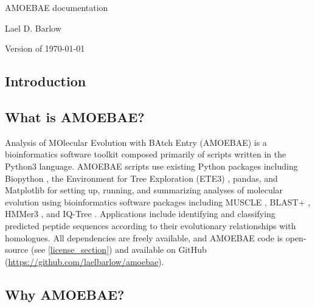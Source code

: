 \documentclass[12pt,letterpaper]{article}
\begin{document}
\begin{titlepage}
	\centering
    {\huge AMOEBAE documentation\par}
	\vspace{2cm}
    {\Large Lael D. Barlow\par}
	\vfill
	{\large Version of \today\par}
\end{titlepage}

\newpage
\tableofcontents

\newpage
{}
\begin{linenumbers}

\section{Introduction}


\subsection{What is AMOEBAE?}

Analysis of MOlecular Evolution with BAtch Entry (AMOEBAE) is a bioinformatics
    software toolkit composed primarily of scripts written in the Python3
    language.  AMOEBAE scripts use existing Python packages including Biopython
    \citep{cock2009}, the Environment for Tree Exploration (ETE3)
    \citep{huerta-cepas2016}, pandas, and Matplotlib \citep{hunter2007} for
    setting up, running, and summarizing analyses of molecular evolution using
    bioinformatics software packages including MUSCLE \citep{edgar2004}, BLAST+
    \citep{camacho2009}, HMMer3 \citep{eddy1998}, and IQ-Tree
    \citep{nguyen2015}. Applications include identifying and classifying
    predicted peptide sequences according to their evolutionary relationships
    with homologues. All dependencies are freely available, and AMOEBAE code is
    open-source (see \autoref*{license_section}) and available on GitHub
    (\url{https://github.com/laelbarlow/amoebae}). 

\subsection{Why AMOEBAE?}


\end{linenumbers}
\end{document}
